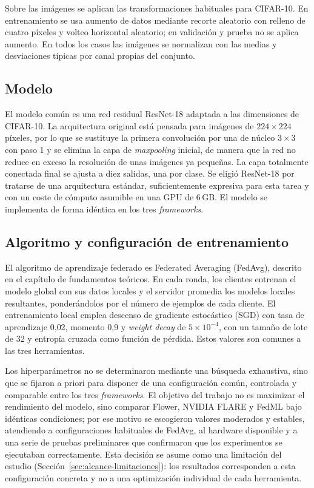 Sobre las imágenes se aplican las transformaciones habituales para CIFAR-10. En entrenamiento se
usa aumento de datos mediante recorte aleatorio con relleno de cuatro píxeles y volteo
horizontal aleatorio; en validación y prueba no se aplica aumento. En todos los casos las
imágenes se normalizan con las medias y desviaciones típicas por canal propias del conjunto.

\subsection{Modelo}\label{sec:modelo}

El modelo común es una red residual ResNet-18 adaptada a las dimensiones de CIFAR-10. La
arquitectura original está pensada para imágenes de $224\times224$ píxeles, por lo que se
sustituye la primera convolución por una de núcleo $3\times3$ con paso 1 y se elimina la capa de
\textit{maxpooling} inicial, de manera que la red no reduce en exceso la resolución de unas
imágenes ya pequeñas. La capa totalmente conectada final se ajusta a diez salidas, una por
clase. Se eligió ResNet-18 por tratarse de una arquitectura estándar, suficientemente expresiva
para esta tarea y con un coste de cómputo asumible en una GPU de 6\,GB. El modelo se implementa
de forma idéntica en los tres \textit{frameworks}.

\subsection{Algoritmo y configuración de entrenamiento}\label{sec:config-entrenamiento}

El algoritmo de aprendizaje federado es Federated Averaging (FedAvg), descrito en el capítulo de
fundamentos teóricos. En cada ronda, los clientes entrenan el modelo global con sus datos
locales y el servidor promedia los modelos locales resultantes, ponderándolos por el número de
ejemplos de cada cliente. El entrenamiento local emplea descenso de gradiente estocástico (SGD) con tasa de
aprendizaje 0{,}02, momento 0{,}9 y \textit{weight decay} de $5\times10^{-4}$, con un tamaño de
lote de 32 y entropía cruzada como función de pérdida. Estos valores son comunes a las tres
herramientas.

Los hiperparámetros no se determinaron mediante una búsqueda exhaustiva, sino que se fijaron a
priori para disponer de una configuración común, controlada y comparable entre los tres
\textit{frameworks}. El objetivo del trabajo no es maximizar el rendimiento del modelo, sino
comparar Flower, NVIDIA FLARE y FedML bajo idénticas condiciones; por ese motivo se escogieron
valores moderados y estables, atendiendo a configuraciones habituales de FedAvg, al hardware
disponible y a una serie de pruebas preliminares que confirmaron que los experimentos se
ejecutaban correctamente. Esta decisión se asume como una limitación del estudio
(Sección~\ref{sec:alcance-limitaciones}): los resultados corresponden a esta configuración
concreta y no a una optimización individual de cada herramienta.

